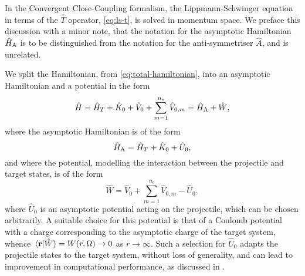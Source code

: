 \documentclass[]{article}
\begin{document}
In the Convergent Close-Coupling formalism, the Lippmann-Schwinger equation in
terms of the $\hat{T}$ operator, \eqref{eq:ls-t}, is solved in momentum space.
We preface this discussion with a minor note, that the notation for the
asymptotic Hamiltonian $\hat{H}_{\rm{A}}$ is to be distinguished from the
notation for the anti-symmetriser $\hat{A}$, and is unrelated.

We split the Hamiltonian, from \eqref{eq:total-hamiltonian}, into an
asymptotic Hamiltonian and a potential in the form
\begin{equation}
  \label{eq:ccc-hamiltonian}
  \hat{H}
  =
  \hat{H}_{T}
  +
  \hat{K}_{0}
  +
  \hat{V}_{0}
  +
  \sum_{m = 1}^{n_{\mathrm{e}}}
  \hat{V}_{0, m}
  =
  \hat{H}_{\rm{A}}
  +
  \hat{W}
  ,
\end{equation}
where the asymptotic Hamiltonian is of the form
\begin{equation}
  \label{eq:ccc-asymptotic-hamiltonian}
  \hat{H}_{\rm{A}}
  =
  \hat{H}_{T}
  +
  \hat{K}_{0}
  +
  \hat{U}_{0}
  ,
\end{equation}
and where the potential, modelling the interaction between the projectile and
target states, is of the form
\begin{equation}
  \label{eq:ccc-potential}
  \hat{W}
  =
  \hat{V}_{0}
  +
  \sum_{m = 1}^{n_{\mathrm{e}}}
  \hat{V}_{0, m}
  -
  \hat{U}_{0}
  ,
\end{equation}
where $\hat{U}_{0}$ is an asymptotic potential acting on the projectile, which
can be chosen arbitrarily.
A suitable choice for this potential is that of a Coulomb potential with a
charge corresponding to the asymptotic charge of the target system, whence
$\braket*{\vb{r}}{\hat{W}} = W(r, \Omega) \to 0$ as $r \to \infty$.
Such a selection for $\hat{U}_{0}$ adapts the projectile states to the target
system, without loss of generality, and can lead to improvement in computational
performance, as discussed in \cite[204]{AJP_BRAY1996}.
\end{document}
